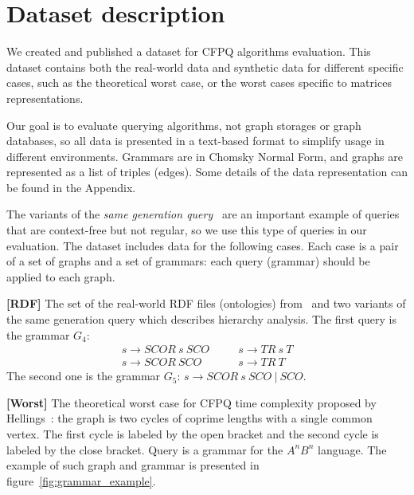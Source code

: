\section{Dataset description}

We created and published a dataset for CFPQ algorithms evaluation.
This dataset contains both the real-world data and synthetic data for different specific cases, such as the theoretical worst case, or the worst cases specific to matrices representations.

Our goal is to evaluate querying algorithms, not graph storages or graph databases, so all data is presented in a text-based format to simplify usage in different environments.
Grammars are in Chomsky Normal Form, and graphs are represented as a list of triples (edges).
Some details of the data representation can be found in the Appendix.

The variants of the \textit{same generation query}~\cite{FndDB} are an important example of queries that are context-free but not regular, so we use this type of queries in our evaluation.
The dataset includes data for the following cases.
Each case is a pair of a set of graphs and a set of grammars: each query (grammar) should be applied to each graph.

\textbf{[RDF]} The set of the real-world RDF files (ontologies) from~\cite{RDF} and two variants of the same generation query which describes hierarchy analysis.
The first query is the grammar $G_4$:
\[
 \begin{array}{lcl}
   s  \rightarrow \textit{SCOR} \ s \ \textit{SCO}   & \quad & s  \rightarrow \textit{TR} \ s \ \textit{T}     \\
   s  \rightarrow \textit{SCOR} \ \textit{SCO}       & \quad & s  \rightarrow  \textit{TR}  \ \textit{T}

 \end{array}
 \]
The second one is the grammar $G_5$: $s \rightarrow \textit{SCOR} \ s \ \textit{SCO} \ | \  \textit{SCO}$.

\textbf{[Worst]} The theoretical worst case for CFPQ time complexity proposed by Hellings~\cite{hellingsPathQuerying}: the graph is two cycles of coprime lengths with a single common vertex.
The first cycle is labeled by the open bracket and the second cycle is labeled by the close bracket.
Query is a grammar for the $A^nB^n$ language.
The example of such graph and grammar is presented in figure~\ref{fig:grammar_example}.

